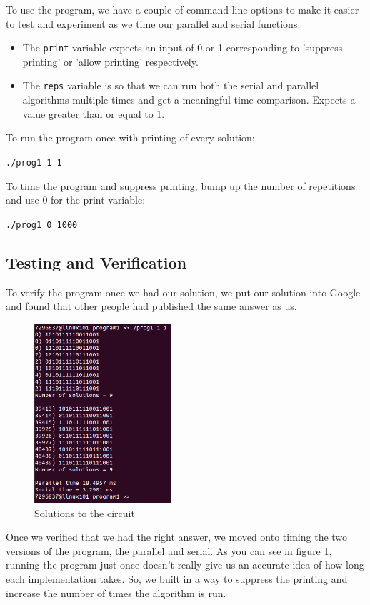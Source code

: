 \documentclass{article}
\begin{document}
\medskip
\noindent
To use the program, we have a couple of command-line options to make it easier to test and experiment as we time our parallel and serial functions. 
\begin{itemize}
    \item The \texttt{print} variable expects an input of 0 or 1 corresponding to 'suppress printing' or 'allow printing' respectively.
    \item The \texttt{reps} variable is so that we can run both the serial and parallel algorithms multiple times and get a meaningful time comparison. Expects a value greater than or equal to 1.
\end{itemize}

\noindent
To run the program once with printing of every solution:

\texttt{./prog1 1 1}

\noindent
To time the program and suppress printing, bump up the number of repetitions and use 0 for the print variable:

\texttt{./prog1 0 1000}

\subsection{Testing and Verification}
To verify the program once we had our solution, we put our solution into Google and found that other people had published the same answer as us.
\begin{figure}[ht]
    \centering
    \includegraphics[width=0.45\textwidth]{verification.png}
    \caption{Solutions to the circuit}
    \label{fig:verification}
\end{figure}

\noindent
Once we verified that we had the right answer, we moved onto timing the two versions of the program, the parallel and serial. As you can see in figure \ref{fig:verification}, running the program just once doesn't really give us an accurate idea of how long each implementation takes. So, we built in a way to suppress the printing and increase the number of times the algorithm is run.
\end{document}
